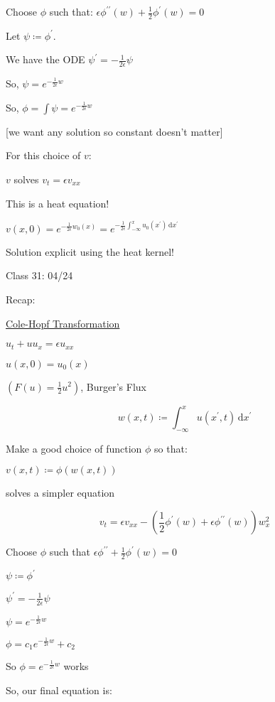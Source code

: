 \documentclass{article}
\theoremstyle{definition}
\begin{document}
Choose \(\phi\) such that: \(\epsilon\phi^{\prime\prime} (w) + \frac{1}{2} \phi ^{\prime} (w) = 0\)  

Let \(\psi \coloneqq \phi ^{\prime} \).

We have the ODE \(\psi^{\prime} = - \frac{1}{2\epsilon} \psi\)

So, \(\psi = e^{-\frac{1}{2 \epsilon}w}\) 

So, \(\phi = \int \psi = e^{-\frac{1}{2 \epsilon}w}\) 

[we want any solution so constant doesn't matter]

For this choice of \(v\):

\(v\) solves \(v_t = \epsilon v_{x x}\) 

This is a heat equation!

\(v(x,0)= e^{-\frac{1}{2 \epsilon}w_0(x)}=e^{-\frac{1}{2\epsilon}\int_{-\infty}^{x} u_0(x^{\prime}) \,\mathrm{d}x^{\prime}  }\) 

Solution explicit using the heat kernel!

\hrulefill

Class 31: 04/24

Recap:

\underline{Cole-Hopf Transformation} 

\(u_t + u u_x = \epsilon u_{x x}\)

\(u(x,0) = u_0(x)\) 

\((F(u) = \frac{1}{2} u^2)\), Burger's Flux

\[
    w(x,t) \coloneqq \int_{-\infty}^{x} u(x^{\prime} , t) \,\mathrm{d}x^{\prime}  
\]

Make a good choice of function \(\phi\) so that:

\(v(x,t) \coloneqq \phi(w(x,t))\) 

solves a simpler equation

\[
    v_t = \epsilon v_{x x} - \left(\frac{1}{2}\phi^{\prime}(w) + \epsilon \phi^{\prime\prime} (w)\right)w_x^2
\]

Choose \(\phi\) such that \(\epsilon \phi^{\prime\prime} + \frac{1}{2} \phi^{\prime} (w) = 0\)

\(\psi \coloneqq \phi ^{\prime} \)

\(\psi ^{\prime}  = -\frac{1}{2\epsilon} \psi\)

\(\psi = e^{- \frac{1}{2\epsilon}w}\)

\(\phi = c_1 e^{-\frac{1}{2\epsilon}w}+c_2\)

So \(\phi = e^{-\frac{1}{2\epsilon}w}\) works

So, our final equation is:
\end{document}
